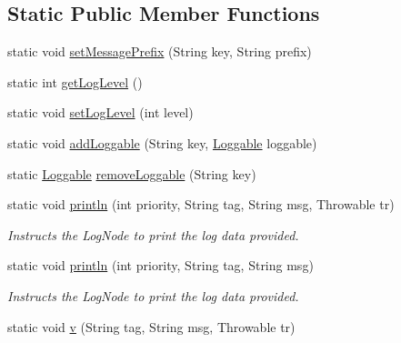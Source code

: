 \subsection*{Static Public Member Functions}
\begin{DoxyCompactItemize}
\item 
static void \hyperlink{classcom_1_1toast_1_1android_1_1gamebase_1_1base_1_1log_1_1_logger_affc6772e3b03c3888d55dbe59e4891ae}{set\+Message\+Prefix} (String key, String prefix)
\item 
static int \hyperlink{classcom_1_1toast_1_1android_1_1gamebase_1_1base_1_1log_1_1_logger_a060b9eca800cda8aa51f3bd02abd9263}{get\+Log\+Level} ()
\item 
static void \hyperlink{classcom_1_1toast_1_1android_1_1gamebase_1_1base_1_1log_1_1_logger_a0ec9520dda7e2062f7455956d093113b}{set\+Log\+Level} (int level)
\item 
static void \hyperlink{classcom_1_1toast_1_1android_1_1gamebase_1_1base_1_1log_1_1_logger_a82d31f975cf96db679b6ee67481daf3b}{add\+Loggable} (String key, \hyperlink{interfacecom_1_1toast_1_1android_1_1gamebase_1_1base_1_1log_1_1_loggable}{Loggable} loggable)
\item 
static \hyperlink{interfacecom_1_1toast_1_1android_1_1gamebase_1_1base_1_1log_1_1_loggable}{Loggable} \hyperlink{classcom_1_1toast_1_1android_1_1gamebase_1_1base_1_1log_1_1_logger_a6598081cafafec0f85b46ad972eeb5ae}{remove\+Loggable} (String key)
\item 
static void \hyperlink{classcom_1_1toast_1_1android_1_1gamebase_1_1base_1_1log_1_1_logger_a5b9aa7ce47bb48e51f971d5a6a2846e1}{println} (int priority, String tag, String msg, Throwable tr)
\begin{DoxyCompactList}\small\item\em Instructs the Log\+Node to print the log data provided. \end{DoxyCompactList}\item 
static void \hyperlink{classcom_1_1toast_1_1android_1_1gamebase_1_1base_1_1log_1_1_logger_aa6339be44dcb4adc33c2636101b4027d}{println} (int priority, String tag, String msg)
\begin{DoxyCompactList}\small\item\em Instructs the Log\+Node to print the log data provided. \end{DoxyCompactList}\item 
static void \hyperlink{classcom_1_1toast_1_1android_1_1gamebase_1_1base_1_1log_1_1_logger_a464a3aa241c116031e6b07af63e0cecc}{v} (String tag, String msg, Throwable tr)

\end{DoxyCompactItemize}
